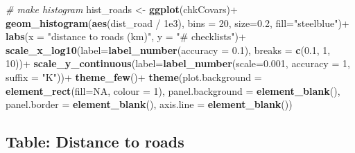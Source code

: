 \documentclass[]{article}
\newenvironment{Shaded}{}{}
\newcommand{\CommentTok}[1]{\textcolor[rgb]{0.38,0.63,0.69}{\textit{#1}}}
\newcommand{\DataTypeTok}[1]{\textcolor[rgb]{0.56,0.13,0.00}{#1}}
\newcommand{\DecValTok}[1]{\textcolor[rgb]{0.25,0.63,0.44}{#1}}
\newcommand{\FloatTok}[1]{\textcolor[rgb]{0.25,0.63,0.44}{#1}}
\newcommand{\KeywordTok}[1]{\textcolor[rgb]{0.00,0.44,0.13}{\textbf{#1}}}
\newcommand{\NormalTok}[1]{#1}
\newcommand{\OperatorTok}[1]{\textcolor[rgb]{0.40,0.40,0.40}{#1}}
\newcommand{\OtherTok}[1]{\textcolor[rgb]{0.00,0.44,0.13}{#1}}
\newcommand{\StringTok}[1]{\textcolor[rgb]{0.25,0.44,0.63}{#1}}
\begin{document}
\begin{Shaded}
\begin{Highlighting}[]

\CommentTok{# make histogram}
\NormalTok{hist_roads <-}\StringTok{ }\KeywordTok{ggplot}\NormalTok{(chkCovars)}\OperatorTok{+}
\StringTok{  }\KeywordTok{geom_histogram}\NormalTok{(}\KeywordTok{aes}\NormalTok{(dist_road }\OperatorTok{/}\StringTok{ }\FloatTok{1e3}\NormalTok{),}
                 \DataTypeTok{bins =} \DecValTok{20}\NormalTok{, }\DataTypeTok{size=}\FloatTok{0.2}\NormalTok{, }\DataTypeTok{fill=}\StringTok{"steelblue"}\NormalTok{)}\OperatorTok{+}
\StringTok{  }\KeywordTok{labs}\NormalTok{(}\DataTypeTok{x =} \StringTok{"distance to roads (km)"}\NormalTok{, }\DataTypeTok{y =} \StringTok{"# checklists"}\NormalTok{)}\OperatorTok{+}
\StringTok{  }\KeywordTok{scale_x_log10}\NormalTok{(}\DataTypeTok{label=}\KeywordTok{label_number}\NormalTok{(}\DataTypeTok{accuracy =} \FloatTok{0.1}\NormalTok{), }
                \DataTypeTok{breaks =} \KeywordTok{c}\NormalTok{(}\FloatTok{0.1}\NormalTok{, }\DecValTok{1}\NormalTok{, }\DecValTok{10}\NormalTok{))}\OperatorTok{+}
\StringTok{  }\KeywordTok{scale_y_continuous}\NormalTok{(}\DataTypeTok{label=}\KeywordTok{label_number}\NormalTok{(}\DataTypeTok{scale=}\FloatTok{0.001}\NormalTok{, }
                                        \DataTypeTok{accuracy =} \DecValTok{1}\NormalTok{, }\DataTypeTok{suffix =} \StringTok{"K"}\NormalTok{))}\OperatorTok{+}
\StringTok{  }\KeywordTok{theme_few}\NormalTok{()}\OperatorTok{+}
\StringTok{  }\KeywordTok{theme}\NormalTok{(}\DataTypeTok{plot.background =} \KeywordTok{element_rect}\NormalTok{(}\DataTypeTok{fill=}\OtherTok{NA}\NormalTok{, }\DataTypeTok{colour =} \DecValTok{1}\NormalTok{),}
        \DataTypeTok{panel.background =} \KeywordTok{element_blank}\NormalTok{(),}
        \DataTypeTok{panel.border =} \KeywordTok{element_blank}\NormalTok{(), }\DataTypeTok{axis.line =} \KeywordTok{element_blank}\NormalTok{())}
\end{Highlighting}
\end{Shaded}

\hypertarget{table-distance-to-roads}{%
\subsection{Table: Distance to roads}\label{table-distance-to-roads}}
\end{document}
